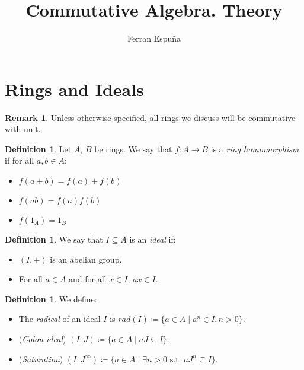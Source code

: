 \documentclass[11pt]{article}
\title{Commutative Algebra. Theory}
\author{Ferran Espuña}
\theoremstyle{definition}
\newtheorem{defn}[theorem]{Definition}
\newtheorem{rk}[theorem]{Remark}
\begin{document}
    \maketitle

    \section{Rings and Ideals}\label{sec:rings-and-ideals}

        \begin{rk}
            Unless otherwise specified, all rings we discuss will be commutative with unit.
        \end{rk}

        \begin{defn}
            Let $A$, $B$ be rings.
            We say that $f: A \longrightarrow B$ is a \emph{ring homomorphism} if for all $a, b \in A$:
            \begin{itemize}
                \item $f(a+b) = f(a) + f(b)$
                \item $f(ab) = f(a) f(b)$
                \item $f(1_A) = 1_B$
            \end{itemize}
        \end{defn}

        \begin{defn}
            We say that $I \subseteq A$ is an \emph{ideal} if:
            \begin{itemize}
                \item $(I,+)$ is an abelian group.
                \item For all $a \in A$ and for all $x\in I$, $ax \in I$.
            \end{itemize}
        \end{defn}

        \begin{defn}
            We define:
            \begin{itemize}
                \item The \emph{radical} of an ideal $I$ is $rad(I) \coloneqq \{a \in A \mid a^{n} \in I, n > 0\}$.
                \item (\emph{Colon ideal}) $(I:J) \coloneqq \{a \in A \mid aJ \subseteq I\}$.
                \item (\emph{Saturation}) $(I:J^{\infty}) \coloneqq \{a \in A \mid \exists n > 0 \text{ s.t. } a J^n \subseteq I\}$.
            \end{itemize}
        \end{defn}
\end{document}
